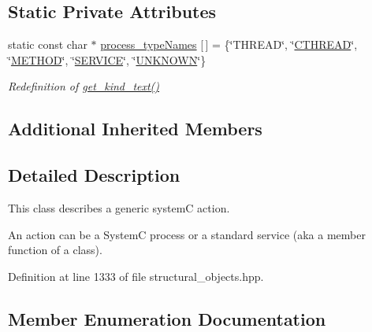 \subsection*{Static Private Attributes}
\begin{DoxyCompactItemize}
\item 
static const char $\ast$ \hyperlink{classaction__o_a62a74b3315f2acaf3aace6c2e093b2f5}{process\+\_\+type\+Names} \mbox{[}$\,$\mbox{]} = \{\char`\"{}T\+H\+R\+E\+AD\char`\"{}, \char`\"{}\hyperlink{classaction__o_a72fdfe1ad9ac24109fe11bb41153b87ba854bd867c7b7d6c4a1cb0e8adf8c8ea1}{C\+T\+H\+R\+E\+AD}\char`\"{}, \char`\"{}\hyperlink{classaction__o_a72fdfe1ad9ac24109fe11bb41153b87baed1ba72c47b31235949577b6ce1a2980}{M\+E\+T\+H\+OD}\char`\"{}, \char`\"{}\hyperlink{classaction__o_a72fdfe1ad9ac24109fe11bb41153b87baec4636f8fb033c67560934b1af7dbed8}{S\+E\+R\+V\+I\+CE}\char`\"{}, \char`\"{}\hyperlink{classaction__o_a72fdfe1ad9ac24109fe11bb41153b87ba13f0a6af19f8554b270706ba9f27c690}{U\+N\+K\+N\+O\+WN}\char`\"{}\}
\begin{DoxyCompactList}\small\item\em Redefinition of \hyperlink{classstructural__object_a36c541b52425c4de8fa45d79285a97e7}{get\+\_\+kind\+\_\+text()} \end{DoxyCompactList}\end{DoxyCompactItemize}
\subsection*{Additional Inherited Members}


\subsection{Detailed Description}
This class describes a generic systemC action. 

An action can be a SystemC process or a standard service (aka a member function of a class). 

Definition at line 1333 of file structural\+\_\+objects.\+hpp.



\subsection{Member Enumeration Documentation}
\mbox{\label{classaction__o_a72fdfe1ad9ac24109fe11bb41153b87b}} 
